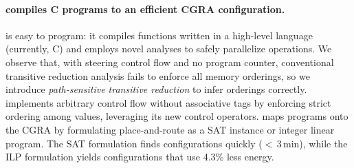 \paragraph{\riptide compiles C programs to an efficient CGRA configuration.}
\riptide is easy to program: it compiles functions written in a high-level
language (currently, C) and employs novel analyses to safely
parallelize operations.
%
We observe that, with steering control flow and no program counter,
conventional transitive reduction analysis fails to enforce all memory
orderings, so we introduce \emph{path-sensitive transitive reduction}
to infer orderings correctly.
%
\riptide implements arbitrary control flow without associative tags by
enforcing strict ordering among values, leveraging its new control
operators.
%
%
\riptide maps programs onto the CGRA by formulating place-and-route as a
SAT instance or integer linear program.
The SAT formulation finds configurations quickly ($<$\,3\,min), while the ILP formulation yields configurations that use 4.3\% less energy.

  
  
  
